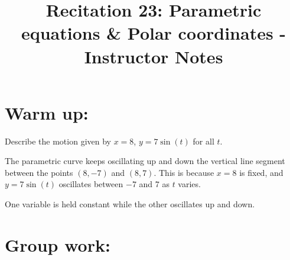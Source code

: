 \documentclass[handout,instructornotes]{ximera}
\title{Recitation 23: Parametric equations \& Polar coordinates - Instructor Notes}
\begin{document}
\begin{abstract}		\end{abstract}
\maketitle




\section{Warm up:}
Describe the motion given by $x=8$, $y=7 \sin (t)$ for all $t$.
	\begin{freeResponse}
	The parametric curve keeps oscillating up and down the vertical line segment between the points $(8,-7)$ and $(8,7)$.
	This is because $x=8$ is fixed, and $y = 7 \sin(t)$ oscillates between $-7$ and $7$ as $t$ varies.
	\end{freeResponse}
	
\begin{instructorNotes}
One variable is held constant while the other oscillates up and down.
\end{instructorNotes}







\section{Group work:}
\end{document}
